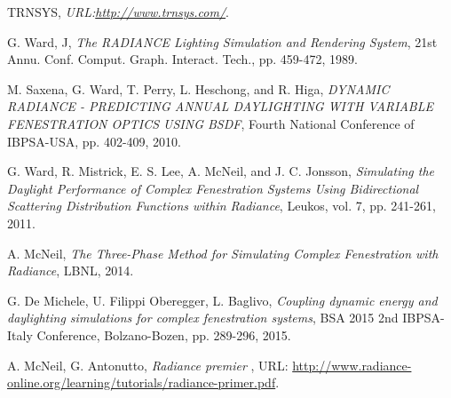 \begin{thebibliography}{1}

 TRNSYS, {\em URL:\url{http://www.trnsys.com/}}.

 G. Ward, J, {\em The RADIANCE Lighting Simulation and Rendering System}, 21st Annu. Conf. Comput. Graph. Interact. Tech., pp. 459-472, 1989.
  
  M. Saxena, G. Ward, T. Perry, L. Heschong, and R. Higa, {\em DYNAMIC RADIANCE - PREDICTING ANNUAL DAYLIGHTING WITH VARIABLE FENESTRATION OPTICS USING BSDF}, Fourth National Conference of IBPSA-USA, pp. 402-409, 2010. 

G. Ward, R. Mistrick, E. S. Lee, A. McNeil, and J. C. Jonsson, {\em Simulating the Daylight Performance of Complex Fenestration Systems Using Bidirectional Scattering Distribution Functions within Radiance}, Leukos, vol. 7, pp. 241-261, 2011.

A. McNeil, {\em The Three-Phase Method for Simulating Complex Fenestration with Radiance}, LBNL, 2014.

G. De Michele, U. Filippi Oberegger, L. Baglivo, {\em Coupling dynamic energy and daylighting simulations for complex fenestration systems}, BSA 2015 2nd IBPSA-Italy Conference, Bolzano-Bozen, pp. 289-296, 2015.

 
 A. McNeil,  G. Antonutto, {\em  Radiance premier }, URL: \url{http://www.radiance-online.org/learning/tutorials/radiance-primer.pdf}.
 

\end{thebibliography}